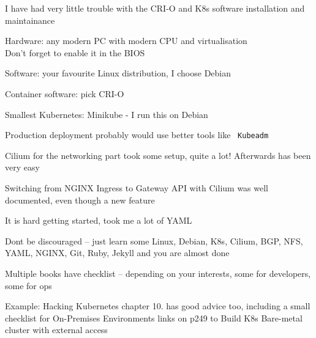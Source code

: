 \documentclass[Screen16to9,17pt]{foils}
\begin{document}
\begin{list2}
\item I have had very little trouble with the CRI-O and K8s software installation and maintainance
\end{list2}





\begin{list2}
\item Hardware: any modern PC with modern CPU and virtualisation\\
Don't forget to enable it in the BIOS
\item Software: your favourite Linux distribution, I choose Debian
\item Container software: pick CRI-O
\item Smallest Kubernetes: Minikube -  I run this on Debian
\item Production deployment probably would use better tools like \faWrench\ \verb+Kubeadm+
\item Cilium for the networking part took some setup, quite a lot! Afterwards has been very easy
\item Switching from NGINX Ingress to Gateway API with Cilium was well documented, even though a new feature
\end{list2}





\begin{list2}
\item It is hard getting started, took me a lot of YAML \smiley
\item Dont be discouraged -- just learn some Linux, Debian, K8s, Cilium, BGP, NFS, YAML, NGINX, Git, Ruby, Jekyll and you are almost done


\item Multiple books have checklist -- depending on your interests, some for developers, some for ops
\item Example: Hacking Kubernetes chapter 10. has good advice too, including a small checklist for On-Premises Environments
links on p249 to Build K8s Bare-metal cluster with external access\\
\\
\\
\end{list2}
\end{document}
